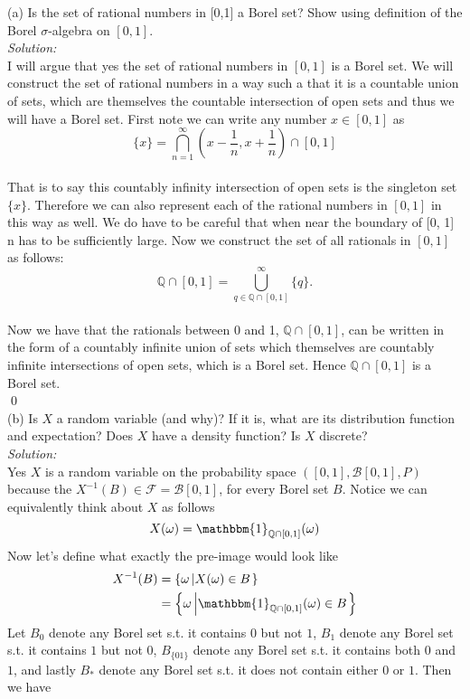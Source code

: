 \documentclass[10pt]{amsart}
\begin{document}
(a) Is the set of rational numbers in [0,1] a Borel set? Show using definition of the Borel  $\sigma$-algebra on $[0,1]$. \\
\textit{Solution:} \\
I will argue that yes the set of rational numbers in $[0, 1]$ is a Borel set.
We will construct the set of rational numbers in a way such a that it is a countable union of sets, which are themselves the countable intersection of open sets and thus we will have a Borel set. First note we can write any number $x \in [0, 1]$ as \\
$$
\{x\} = \bigcap_{n=1}^{\infty} \left(x - \frac{1}{n}, x + \frac{1}{n}\right)\cap [0, 1]
$$
\\
That is to say this countably infinity intersection of open sets is the singleton set $\{x\}$.
Therefore we can also represent each of the rational numbers in $[0, 1]$ in this way as well.
We do have to be careful that when near the boundary of [0, 1] n has to be sufficiently large.
Now we construct the set of all rationals in $[0, 1]$ as follows: \\
$$
\mathbb{Q} \cap [0,1] = \bigcup_{q\in \mathbb{Q} \cap [0,1]}^\infty \{q\}.
$$ \\
Now we have that the rationals between 0 and 1, $\mathbb{Q} \cap [0, 1]$, can be written in the form of a countably infinite union of sets which themselves are countably infinite intersections of open sets, which is a Borel set. Hence $\mathbb{Q} \cap [0, 1]$ is a Borel set. \\
\qed
\\
(b) Is $X$ a random variable (and why)? If it is, what are its distribution function and expectation? Does $X$ have a density function? Is $X$ discrete? \\
\textit{Solution:} \\
Yes $X$ is a random variable on the probability space $([0,1],\mathcal{B}[0,1],P)$ because the $X^{-1}(B) \in \mathcal F = \mathcal{B}[0,1]$, for every Borel set $B$. Notice we can equivalently think about $X$ as follows
$$ X(\omega) = \mathbbm{1}_{\mathbb{Q} \cap [0, 1]}(\omega) $$
Now let's define what exactly the pre-image would look like
\begin{align*}
X^{-1}(B) &= \left\{ \omega \left| X(\omega) \in B \right.\right\} \\
	       &= \left\{ \omega \left| \mathbbm{1}_{\mathbb{Q} \cap [0, 1]}(\omega) \in B \right.\right\}
\end{align*}
Let $B_0$ denote any Borel set s.t. it contains $0$ but not $1$, $B_1$ denote any Borel set s.t. it contains $1$ but not $0$, $B_{\{01\}}$ denote any Borel set s.t. it contains both $0$ and $1$, and lastly $B_*$ denote any Borel set s.t. it does not contain either $0$ or $1$. Then we have
\end{document}
